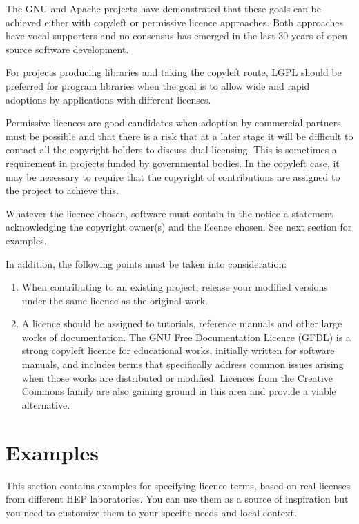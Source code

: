 \documentclass[12pt,a4paper]{article}
\begin{document}
The GNU and Apache projects have demonstrated that these goals can be achieved either with copyleft or permissive licence approaches. Both approaches have vocal supporters and no consensus has emerged in the last 30 years of open source software development.

For projects producing libraries and taking the copyleft route, LGPL should be preferred for program libraries when the goal is to allow wide and rapid adoptions by applications with different licenses. 


Permissive licences are good candidates when adoption by commercial partners must be possible and that there is a risk that at a later stage it will be difficult to contact all the copyright holders to discuss dual licensing. This is sometimes a requirement in projects funded by governmental bodies. In the copyleft case, it may be necessary to require that the copyright of contributions are assigned to the project to achieve this.

Whatever the licence chosen, software must contain in the notice a statement acknowledging the copyright owner(s) and the licence chosen. See next section for examples.

In addition, the following points must be taken into consideration:
\begin{enumerate}
\item	When contributing to an existing project, release your modified versions under the same licence as the original work.  
\item	A licence should be assigned to tutorials, reference manuals and other large works of documentation. The GNU Free Documentation Licence (GFDL) \cite{[7]} is a strong copyleft licence for educational works, initially written for software manuals, and includes terms that specifically address common issues arising when those works are distributed or modified. Licences from the Creative Commons family are also gaining ground in this area and provide a viable alternative.\cite{[8]}
\end{enumerate}

\section{Examples}
\label{sec:Examples}

This section contains examples for specifying licence terms, based on real licenses from different HEP laboratories. You can use them as a source of inspiration but you need to customize them to your specific needs and local context.
\end{document}
